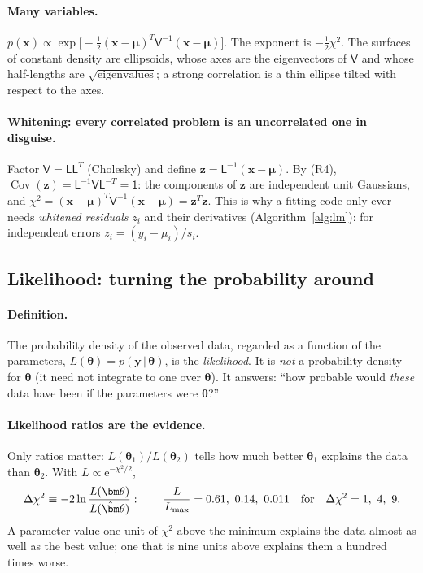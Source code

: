 \documentclass[11pt,a4paper]{article}
\numberwithin{equation}{section}
\theoremstyle{definition}
\theoremstyle{plain}
\theoremstyle{remark}
\numberwithin{algorithm}{section}
\newcommand{\ee}{\mathrm{e}}
\newcommand{\sV}{\mathsf V}
\newcommand{\sI}{\mathsf 1}
\newcommand{\vth}{\bm\theta}
\begin{document}
\paragraph{Many variables.} $p(\bm x)\propto\exp\big[-\frac12(\bm x-\bm\mu)^T\sV^{-1}(\bm x-\bm\mu)\big]$. The exponent is $-\frac12\chi^2$. The surfaces of constant density are ellipsoids, whose axes are the eigenvectors of $\sV$ and whose half-lengths are $\sqrt{\text{eigenvalues}}$; a strong correlation is a thin ellipse tilted with respect to the axes.

\paragraph{Whitening: every correlated problem is an uncorrelated one in disguise.} Factor $\sV=\mathsf L\mathsf L^T$ (Cholesky) and define $\bm z=\mathsf L^{-1}(\bm x-\bm\mu)$. By (R4), $\operatorname{Cov}(\bm z)=\mathsf L^{-1}\sV\mathsf L^{-T}=\sI$: the components of $\bm z$ are independent unit Gaussians, and $\chi^2=(\bm x-\bm\mu)^T\sV^{-1}(\bm x-\bm\mu)=\bm z^T\bm z$. This is why a fitting code only ever needs \emph{whitened residuals} $z_i$ and their derivatives (Algorithm~\ref{alg:lm}): for independent errors $z_i=(y_i-\mu_i)/s_i$.

\subsection{Likelihood: turning the probability around}\label{sec:pr-likelihood}
\paragraph{Definition.} The probability density of the observed data, regarded as a function of the parameters, $L(\vth)=p(\bm y\,|\,\vth)$, is the \emph{likelihood}. It is \emph{not} a probability density for $\vth$ (it need not integrate to one over $\vth$). It answers: ``how probable would \emph{these} data have been if the parameters were $\vth$?''
\paragraph{Likelihood ratios are the evidence.} Only ratios matter: $L(\vth_1)/L(\vth_2)$ tells how much better $\vth_1$ explains the data than $\vth_2$. With $L\propto\ee^{-\chi^2/2}$,
\[
\Delta\chi^2\equiv-2\ln\frac{L(\vth)}{L(\hat\vth)}:\qquad \frac{L}{L_{\max}}=0.61,\ 0.14,\ 0.011\quad\text{for}\quad\Delta\chi^2=1,\ 4,\ 9 .
\]
A parameter value one unit of $\chi^2$ above the minimum explains the data almost as well as the best value; one that is nine units above explains them a hundred times worse.
\end{document}

